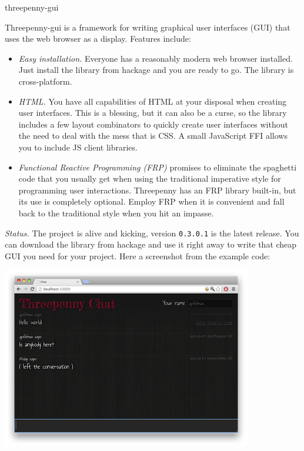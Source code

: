 \begin{hcarentry}[new]{threepenny-gui}
\label{threepenny-gui}
\makeheader

Threepenny-gui is a framework for writing graphical user interfaces (GUI) that uses the web browser as a display. Features include:

\begin{itemize}
\item \emph{Easy installation.} Everyone has a reasonably modern web browser installed. Just install the library from hackage and you are ready to go. The library is cross-platform.
\item \emph{HTML.} You have all capabilities of HTML at your disposal when creating user interfaces. This is a blessing, but it can also be a curse, so the library includes a few layout combinators to quickly create user interfaces without the need to deal with the mess that is CSS. A small JavaScript FFI allows you to include JS client libraries.
\item \emph{Functional Reactive Programming (FRP)} promises to eliminate the spaghetti code that you usually get when using the traditional imperative style for programming user interactions. Threepenny has an FRP library built-in, but its use is completely optional. Employ FRP when it is convenient and fall back to the traditional style when you hit an impasse.
\end{itemize}

\emph{Status.}
The project is alive and kicking, version \verb`0.3.0.1` is the latest release. You can download the library from hackage and use it right away to write that cheap GUI you need for your project. Here a screenshot from the example code:

\begin{center}
\includegraphics{html/chat.jpg}
\end{center}


\end{hcarentry}
